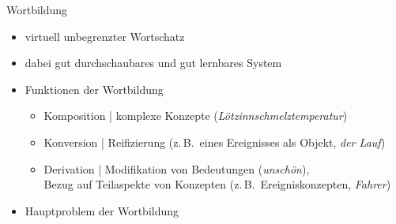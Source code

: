 \begin{frame}
  {Wortbildung}
  \onslide<+->
  \begin{itemize}[<+->]
    \item virtuell unbegrenzter Wortschatz
      \Zeile
    \item dabei gut durchschaubares und \alert{gut lernbares} System\\
      \Zeile
    \item Funktionen der Wortbildung
      \begin{itemize}
        \item Komposition | \alert{komplexe Konzepte} (\textit{Lötzinnschmelztemperatur})
        \item Konversion | \alert{Reifizierung} (z.\,B.\ eines Ereignisses als Objekt, \textit{der Lauf})
        \item Derivation | \alert{Modifikation von Bedeutungen} (\textit{\alert{un}schön}),\\
          \alert{Bezug auf Teilaspekte von Konzepten} (z.\,B.\ Ereigniskonzepten, \textit{Fahr\alert{er}})
      \end{itemize}
      \Halbzeile
    \item Hauptproblem der Wortbildung\\
  \end{itemize}
\end{frame}


